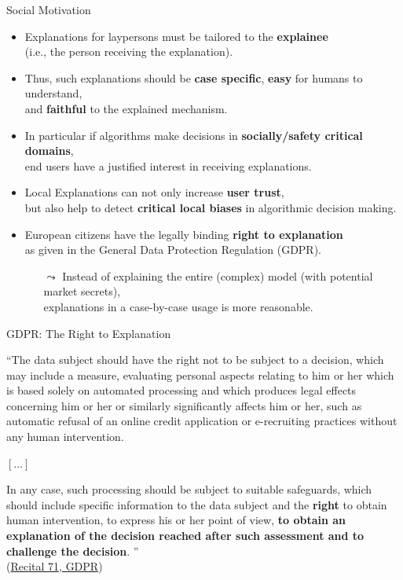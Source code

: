 \documentclass[11pt,compress,t,notes=noshow, aspectratio=169, xcolor=table]{beamer}
\begin{document}
\begin{vbframe}[c]{Social Motivation}

	\begin{itemize}
		\item Explanations for laypersons must be tailored to the \textbf{explainee}\\ (i.e., the person receiving the explanation).
		\pause
		\item Thus, such explanations should be \textbf{case specific}, \textbf{easy} for humans to understand,\\ and \textbf{faithful} to the explained mechanism.
		\pause
		\item In particular if algorithms make decisions in \textbf{socially/safety critical domains},\\ end users have a justified interest in receiving explanations.
		\pause
		\item Local Explanations can not only increase \textbf{user trust},\\ but also help to detect \textbf{critical local biases} in algorithmic decision making.
		\pause
		\item European citizens have the legally binding \textbf{right to explanation}\\ as given in the General Data Protection Regulation (GDPR).
		\begin{itemize}
		    \item[$\leadsto$] Instead of explaining the entire (complex) model (with potential market secrets),\\ explanations in a case-by-case usage is more reasonable.
		\end{itemize}

	\end{itemize}
\end{vbframe}


\begin{vbframe}[c]{GDPR: The Right to Explanation}

    ``The data subject should have the right not to be subject to a decision, which may include a measure, evaluating personal aspects relating to him or her which is based solely on automated processing and which produces legal effects concerning him or her or similarly significantly affects him or her, such as automatic refusal of an online credit application or e-recruiting practices without any human intervention.

$[\ldots]$

In any case, such processing should be subject to suitable safeguards, which should include specific information to the data subject and the \textbf{right} to obtain human intervention, to express his or her point of view, \textbf{to obtain an explanation of the decision reached after such assessment and to challenge the decision}.
'' \\[0.2cm] (\href{https://gdpr-text.com/read/recital-71/}{Recital 71, GDPR})
\end{vbframe}
\end{document}
